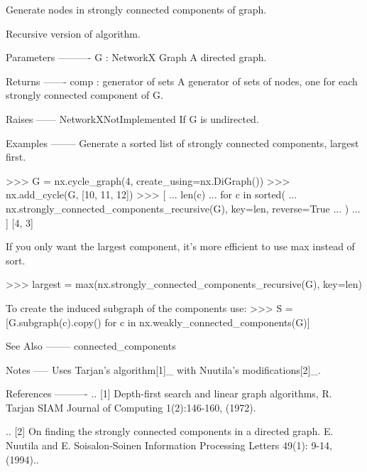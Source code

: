 \begin{DoxyVerb}Generate nodes in strongly connected components of graph.

Recursive version of algorithm.

Parameters
----------
G : NetworkX Graph
    A directed graph.

Returns
-------
comp : generator of sets
    A generator of sets of nodes, one for each strongly connected
    component of G.

Raises
------
NetworkXNotImplemented
    If G is undirected.

Examples
--------
Generate a sorted list of strongly connected components, largest first.

>>> G = nx.cycle_graph(4, create_using=nx.DiGraph())
>>> nx.add_cycle(G, [10, 11, 12])
>>> [
...     len(c)
...     for c in sorted(
...         nx.strongly_connected_components_recursive(G), key=len, reverse=True
...     )
... ]
[4, 3]

If you only want the largest component, it's more efficient to
use max instead of sort.

>>> largest = max(nx.strongly_connected_components_recursive(G), key=len)

To create the induced subgraph of the components use:
>>> S = [G.subgraph(c).copy() for c in nx.weakly_connected_components(G)]

See Also
--------
connected_components

Notes
-----
Uses Tarjan's algorithm[1]_ with Nuutila's modifications[2]_.

References
----------
.. [1] Depth-first search and linear graph algorithms, R. Tarjan
   SIAM Journal of Computing 1(2):146-160, (1972).

.. [2] On finding the strongly connected components in a directed graph.
   E. Nuutila and E. Soisalon-Soinen
   Information Processing Letters 49(1): 9-14, (1994)..\end{DoxyVerb}
 